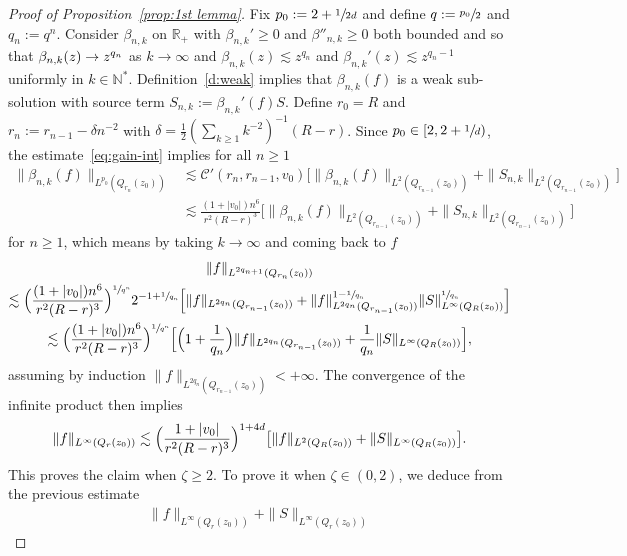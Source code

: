 \documentclass[11pt]{article}
\numberwithin{equation}{section}\let\oldbigcup\bigcup
\let\mathcal\mathscr
\theoremstyle{definition}
\theoremstyle{remark}
\newcommand\N{{\mathbb N}}
\newcommand\R{{\mathbb R}}
\newcommand{\cC}{\mathcal C}
\begin{document}
\begin{proof}[Proof of Proposition~\ref{prop:1st lemma}]
Fix $p_0:=2+\sfrac{1}{2d}$ and define $q:=\sfrac{p_0}{2}$ and
$q_n := q^n$. Consider $\beta_{n,k}$ on $\R_+$ with
$\beta_{n,k}' \ge 0$ and $\beta''_{n,k} \ge 0$ both bounded and
so that $\beta_{n,k}(z) \to\nobreak z^{q_n}$ as $k \to \infty$ and
$\beta_{n,k}(z) \lesssim z^{q_n}$ and
$\beta_{n,k}'(z) \lesssim z^{q_n-1}$ uniformly in $k \in
\N^*$. Definition~\ref{d:weak} implies that
$\beta_{n,k}(f)$ is a weak sub-solution with source term
$S_{n,k} := \beta_{n,k}'(f) S$. Define $r_0=R$ and
$r_n := r_{n-1} - \delta n^{-2}$ with
$\delta = \frac12( \sum_{k \ge 1} k^{-2}
)^{-1}(R-r)$. Since $p_0 \in [2,2+\sfrac1d)$, the
estimate~\eqref{eq:gain-int} implies for all $n \ge 1$
\begin{align*}
\|\beta_{n,k}(f)\|_{L^{p_0}(Q_{r_n}(z_0))}
& \lesssim
\cC'(r_n,r_{n-1},v_0) \bigl[
\|\beta_{n,k}(f)\|_{L^{2}(Q_{r_{n-1}}(z_0))}
+ \|S_{n,k}\|_{L^2(Q_{r_{n-1}}(z_0))} \bigr] \\
& \lesssim \frac{(1+|v_0|)n^6}{r^2(R-r)^3}
\bigl[ \|\beta_{n,k}(f)\|_{L^{2}(Q_{r_{n-1}}(z_0))}
+ \|S_{n,k}\|_{L^2(Q_{r_{n-1}}(z_0))} \bigr]
\end{align*}
for $n \ge 1$, which means by taking $k \to \infty$ and coming
back to $f$
\begin{multline*}
\|f\|_{L^{2q_{n+1}}(Q_{r_n}(z_0))} \\
\lesssim \Bigl(
\frac{(1+|v_0|)n^6}{r^2(R-r)^3} \Bigr)^{\sfrac{1}{q^n}}
2^{-1+\sfrac{1}{q_n}} \Bigl[
\|f\|_{L^{2q_n}(Q_{r_{n-1}}(z_0))} + \|
f\|_{L^{2q_n}(Q_{r_{n-1}}(z_0))}^{1-\sfrac{1}{q_n}}
\|S\|_{L^\infty(Q_R(z_0))}^{\sfrac{1}{q_n}} \Bigr] \\
\lesssim \Bigl(
\frac{(1+|v_0|)n^6}{r^2(R-r)^3} \Bigr)^{\sfrac{1}{q^n}}
\Bigl[ \Bigl( 1 + \frac{1}{q_n} \Bigr)
\|f\|_{L^{2q_n}(Q_{r_{n-1}}(z_0))} + \frac{1}{q_n}
\|S\|_{L^\infty(Q_R(z_0))} \Bigr],
\end{multline*}
assuming by induction
$\|f\|_{L^{2q_n}(Q_{r_{n-1}}(z_0))} < +\infty$. The convergence
of the infinite product then implies
\begin{equation*}
\|f\|_{L^\infty(Q_r(z_0))}
\lesssim \Bigl( \frac{1+|v_0|}{r^2(R-r)^3}
\Bigr)^{1+4d} \bigl[ \|f\|_{L^2(Q_R(z_0))} +
\|S\|_{L^\infty(Q_R(z_0))} \bigr].
\end{equation*}
This proves the claim when $\zeta \ge 2$. To prove it when
$\zeta \in (0,2)$, we deduce from the previous estimate
\begin{multline*}
\|f\|_{L^\infty(Q_r(z_0))} + \|S\|_{L^\infty(Q_r(z_0))}

\end{multline*}
\end{proof}
\end{document}
